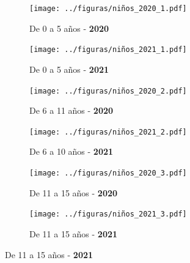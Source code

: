 \documentclass[12pt,a4paper,openany]{book}
\begin{document}
\begin{figure}[h]
	\caption{Casos y defunciones por quinquenio en población pediátrica 2020-2021.}
	\label{fig:niños_2021}
	\centering
	\begin{subfigure}[b]{0.45\textwidth}
		\centering
		\texttt{[image: ../figuras/niños\_2020\_1.pdf]}
		\caption{De 0 a 5 años - \textbf{2020}}
	\end{subfigure}
	\hfill
	\begin{subfigure}[b]{0.45\textwidth}
		\centering
		\texttt{[image: ../figuras/niños\_2021\_1.pdf]}
		\caption{De 0 a 5 años - \textbf{2021}}
	\end{subfigure}
	
	\vspace{10mm}
	\begin{subfigure}[b]{0.45\textwidth}
		\centering
		\texttt{[image: ../figuras/niños\_2020\_2.pdf]}
		\caption{De 6 a 11 años - \textbf{2020}}
	\end{subfigure}
	\hfill
	\begin{subfigure}[b]{0.45\textwidth}
		\centering
		\texttt{[image: ../figuras/niños\_2021\_2.pdf]}
		\caption{De 6 a 10 años - \textbf{2021}}
	\end{subfigure}
	
	\vspace{10mm}
	\begin{subfigure}[b]{0.45\textwidth}
		\centering
		\texttt{[image: ../figuras/niños\_2020\_3.pdf]}
		\caption{De 11 a 15 años - \textbf{2020}}
	\end{subfigure}
	\hfill
	\begin{subfigure}[b]{0.45\textwidth}
		\centering
		\texttt{[image: ../figuras/niños\_2021\_3.pdf]}
		\caption{De 11 a 15 años - \textbf{2021}}
	\end{subfigure}
\end{figure}
\end{document}
